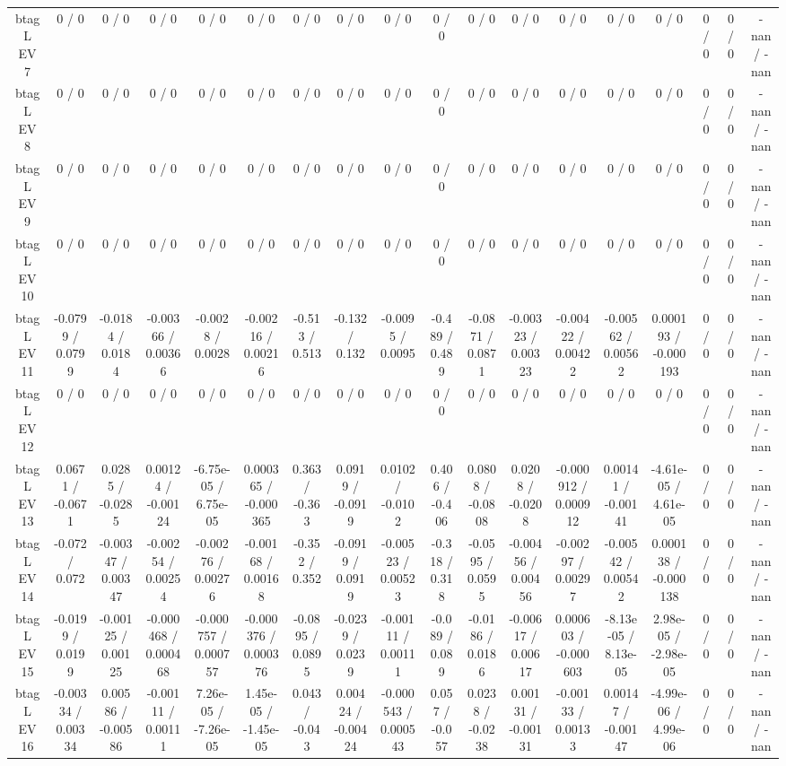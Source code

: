 \documentclass[10pt]{article}
\begin{document}
\begin{table}[htbp]
\begin{center}
\begin{tabular}{|c|c|c|c|c|c|c|c|c|c|c|c|c|c|c|c|c|c|}
  btag L EV 7 & 0 / 0 & 0 / 0 & 0 / 0 & 0 / 0 & 0 / 0 & 0 / 0 & 0 / 0 & 0 / 0 & 0 / 0 & 0 / 0 & 0 / 0 & 0 / 0 & 0 / 0 & 0 / 0 & 0 / 0 & 0 / 0 & -nan / -nan \\ 
  btag L EV 8 & 0 / 0 & 0 / 0 & 0 / 0 & 0 / 0 & 0 / 0 & 0 / 0 & 0 / 0 & 0 / 0 & 0 / 0 & 0 / 0 & 0 / 0 & 0 / 0 & 0 / 0 & 0 / 0 & 0 / 0 & 0 / 0 & -nan / -nan \\ 
  btag L EV 9 & 0 / 0 & 0 / 0 & 0 / 0 & 0 / 0 & 0 / 0 & 0 / 0 & 0 / 0 & 0 / 0 & 0 / 0 & 0 / 0 & 0 / 0 & 0 / 0 & 0 / 0 & 0 / 0 & 0 / 0 & 0 / 0 & -nan / -nan \\ 
  btag L EV 10 & 0 / 0 & 0 / 0 & 0 / 0 & 0 / 0 & 0 / 0 & 0 / 0 & 0 / 0 & 0 / 0 & 0 / 0 & 0 / 0 & 0 / 0 & 0 / 0 & 0 / 0 & 0 / 0 & 0 / 0 & 0 / 0 & -nan / -nan \\ 
  btag L EV 11 & -0.0799 / 0.0799 & -0.0184 / 0.0184 & -0.00366 / 0.00366 & -0.0028 / 0.0028 & -0.00216 / 0.00216 & -0.513 / 0.513 & -0.132 / 0.132 & -0.0095 / 0.0095 & -0.489 / 0.489 & -0.0871 / 0.0871 & -0.00323 / 0.00323 & -0.00422 / 0.00422 & -0.00562 / 0.00562 & 0.000193 / -0.000193 & 0 / 0 & 0 / 0 & -nan / -nan \\ 
  btag L EV 12 & 0 / 0 & 0 / 0 & 0 / 0 & 0 / 0 & 0 / 0 & 0 / 0 & 0 / 0 & 0 / 0 & 0 / 0 & 0 / 0 & 0 / 0 & 0 / 0 & 0 / 0 & 0 / 0 & 0 / 0 & 0 / 0 & -nan / -nan \\ 
  btag L EV 13 & 0.0671 / -0.0671 & 0.0285 / -0.0285 & 0.00124 / -0.00124 & -6.75e-05 / 6.75e-05 & 0.000365 / -0.000365 & 0.363 / -0.363 & 0.0919 / -0.0919 & 0.0102 / -0.0102 & 0.406 / -0.406 & 0.0808 / -0.0808 & 0.0208 / -0.0208 & -0.000912 / 0.000912 & 0.00141 / -0.00141 & -4.61e-05 / 4.61e-05 & 0 / 0 & 0 / 0 & -nan / -nan \\ 
  btag L EV 14 & -0.072 / 0.072 & -0.00347 / 0.00347 & -0.00254 / 0.00254 & -0.00276 / 0.00276 & -0.00168 / 0.00168 & -0.352 / 0.352 & -0.0919 / 0.0919 & -0.00523 / 0.00523 & -0.318 / 0.318 & -0.0595 / 0.0595 & -0.00456 / 0.00456 & -0.00297 / 0.00297 & -0.00542 / 0.00542 & 0.000138 / -0.000138 & 0 / 0 & 0 / 0 & -nan / -nan \\ 
  btag L EV 15 & -0.0199 / 0.0199 & -0.00125 / 0.00125 & -0.000468 / 0.000468 & -0.000757 / 0.000757 & -0.000376 / 0.000376 & -0.0895 / 0.0895 & -0.0239 / 0.0239 & -0.00111 / 0.00111 & -0.089 / 0.089 & -0.0186 / 0.0186 & -0.00617 / 0.00617 & 0.000603 / -0.000603 & -8.13e-05 / 8.13e-05 & 2.98e-05 / -2.98e-05 & 0 / 0 & 0 / 0 & -nan / -nan \\ 
  btag L EV 16 & -0.00334 / 0.00334 & 0.00586 / -0.00586 & -0.00111 / 0.00111 & 7.26e-05 / -7.26e-05 & 1.45e-05 / -1.45e-05 & 0.043 / -0.043 & 0.00424 / -0.00424 & -0.000543 / 0.000543 & 0.057 / -0.057 & 0.0238 / -0.0238 & 0.00131 / -0.00131 & -0.00133 / 0.00133 & 0.00147 / -0.00147 & -4.99e-06 / 4.99e-06 & 0 / 0 & 0 / 0 & -nan / -nan \\ 

\end{tabular}
\end{center}
\end{table}
\end{document}
